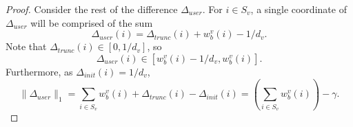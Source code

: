 \begin{proof}
Consider the rest of the difference $\Delta_{user}$. For $i \in S_v$, a single coordinate of $\Delta_{user}$ will be comprised of the sum
\begin{equation*}
    \Delta_{user}(i) = \Delta_{trunc}(i) + w_b^v(i) - 1/d_v.
\end{equation*}
Note that $\Delta_{trunc}(i) \in [0,1/d_v]$, so
\begin{equation*}
    \Delta_{user}(i) \in \left[w_b^v(i) - 1/d_v, w_b^v(i)\right].
\end{equation*}
Furthermore, as $\Delta_{init}(i) = 1/d_v$,
\begin{equation*}
    \|\Delta_{user}\|_1 = 
    \sum_{i \in S_v} w_b^v(i) + \Delta_{trunc}(i) - \Delta_{init}(i)
    = \left(\sum_{i \in S_v} w_b^v(i) \right) - \gamma.
\end{equation*}


\end{proof}
